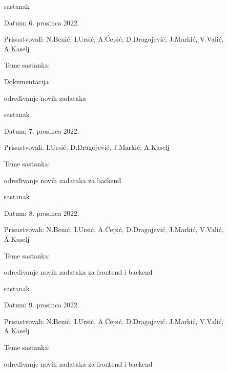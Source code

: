 \begin{packed_enum}
		\item  sastanak
				\item[] \begin{packed_item}
					\item Datum: 6. prosinca 2022.
					\item Prisustvovali: N.Benić, I.Ursić, A.Ćepić, D.Dragojević, J.Markić, V.Valić, A.Kaselj 
					\item Teme sastanka:
					\begin{packed_item}
						\item Dokumentacija
						\item  određivanje novih zadataka
					\end{packed_item}
				\end{packed_item}
	
	   \item  sastanak
				\item[] \begin{packed_item}
					\item Datum: 7. prosinca 2022.
					\item Prisustvovali:  I.Ursić, D.Dragojević, J.Markić, A.Kaselj 
					\item Teme sastanka:
					\begin{packed_item}
						\item  određivanje novih zadataka za backend
					\end{packed_item}
				\end{packed_item}
	
	   \item  sastanak
				\item[] \begin{packed_item}
					\item Datum: 8. prosinca 2022.
					\item Prisustvovali: N.Benić, I.Ursić, A.Ćepić, D.Dragojević, J.Markić, V.Valić, A.Kaselj 
					\item Teme sastanka:
					\begin{packed_item}
						\item  određivanje novih zadataka za frontend i backend
					\end{packed_item}
				\end{packed_item}
	
	   \item  sastanak
				\item[] \begin{packed_item}
					\item Datum: 9. prosinca 2022.
					\item Prisustvovali: N.Benić, I.Ursić, A.Ćepić, D.Dragojević, J.Markić, V.Valić, A.Kaselj 
					\item Teme sastanka:
					\begin{packed_item}
						\item  određivanje novih zadataka za frontend i backend
					\end{packed_item}
				\end{packed_item}
	

\end{packed_enum}

